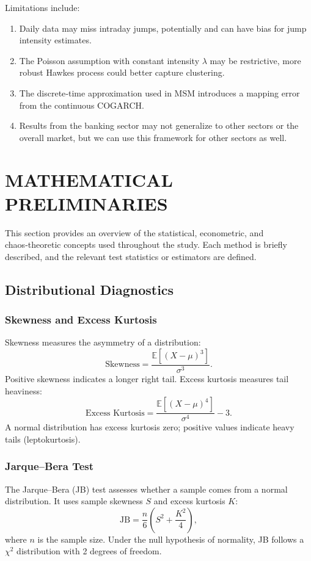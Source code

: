 Limitations include:
\begin{enumerate}[label=(\roman*)]
    \item Daily data may miss intraday jumps, potentially and can have bias for jump intensity estimates.
    \item The Poisson assumption with constant intensity $\lambda$ may be restrictive, more robust Hawkes process could better capture clustering.
    \item The discrete‑time approximation used in MSM introduces a mapping error from the continuous COGARCH.
    \item Results from the banking sector may not generalize to other sectors or the overall market, but we can use this framework for other sectors as well.
\end{enumerate}

\section{MATHEMATICAL PRELIMINARIES}

This section provides an overview of the statistical, econometric, and chaos‑theoretic concepts used throughout the study. Each method is briefly described, and the relevant test statistics or estimators are defined.

\subsection{Distributional Diagnostics}

\subsubsection{Skewness and Excess Kurtosis}
Skewness measures the asymmetry of a distribution:
\[
\text{Skewness} = \frac{\mathbb{E}[(X-\mu)^3]}{\sigma^3}.
\]
Positive skewness indicates a longer right tail. Excess kurtosis measures tail heaviness:
\[
\text{Excess Kurtosis} = \frac{\mathbb{E}[(X-\mu)^4]}{\sigma^4} - 3.
\]
A normal distribution has excess kurtosis zero; positive values indicate heavy tails (leptokurtosis).

\subsubsection{Jarque–Bera Test}
The Jarque–Bera (JB) test assesses whether a sample comes from a normal distribution. It uses sample skewness \(S\) and excess kurtosis \(K\):
\[
\text{JB} = \frac{n}{6}\left(S^2 + \frac{K^2}{4}\right),
\]
where \(n\) is the sample size. Under the null hypothesis of normality, JB follows a \(\chi^2\) distribution with 2 degrees of freedom.

